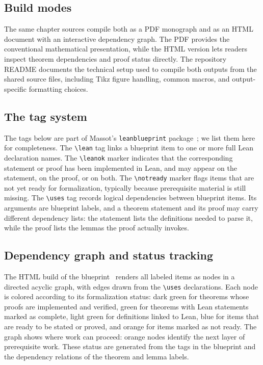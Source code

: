 

\subsection{Build modes}\label{sec:bp_build}

The same chapter sources compile both as a PDF monograph and as an HTML document with an interactive dependency graph. The PDF provides the conventional mathematical presentation, while the HTML version lets readers inspect theorem dependencies and proof status directly.
The repository README documents the technical setup used to compile both outputs from the shared source files, including Tikz figure handling, common macros, and output-specific formatting choices.


\subsection{The tag system}\label{sec:bp_tags}

The tags below are part of Massot's \texttt{leanblueprint} package~\cite{Massot2021Leanblueprint}; we list them here for completeness.
The \texttt{\textbackslash{}lean} tag links a blueprint item to one or more full Lean declaration names. The \texttt{\textbackslash{}leanok} marker indicates that the corresponding statement or proof has been implemented in Lean, and may appear on the statement, on the proof, or on both. The \texttt{\textbackslash{}notready} marker flags items that are not yet ready for formalization, typically because prerequisite material is still missing. The \texttt{\textbackslash{}uses} tag records logical dependencies between blueprint items. Its arguments are blueprint labels, and a theorem statement and its proof may carry different dependency lists: the statement lists the
definitions needed to parse it, while the proof lists the lemmas the proof
actually invokes.

\subsection{Dependency graph and status tracking}\label{sec:bp_depgraph}

The HTML build of the blueprint~\cite{TNLeanBlueprint} renders all labeled items as nodes in a directed acyclic graph, with edges drawn from the \texttt{\textbackslash{}uses} declarations. Each node is colored according to its formalization status: dark green for theorems whose proofs are implemented and verified, green for theorems with Lean statements marked as complete, light green for definitions linked to Lean, blue for items that are ready to be stated or proved, and orange for items marked as not ready. The graph shows where work can proceed: orange nodes identify the next layer of prerequisite work. These status are generated from the tags in the blueprint and the dependency relations of the theorem and lemma labels.

